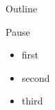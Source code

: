 \documentclass{beamer} %
\begin{document}
\begin{frame}{Outline}
\end{frame}

\begin{frame}{Pause}
    \begin{itemize}
        \item first
        \item second
        \item \pause third
    \end{itemize}
\end{frame}
\end{document}

